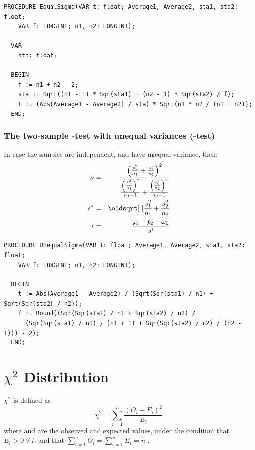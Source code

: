 \begin{refsection}
\begin{lstlisting}[caption=t for independent samples of equal variance]
  PROCEDURE EqualSigma(VAR t: float; Average1, Average2, sta1, sta2: float;
    VAR f: LONGINT; n1, n2: LONGINT);

  VAR
    sta: float;

  BEGIN
    f := n1 + n2 - 2;
    sta := Sqrt((n1 - 1) * Sqr(sta1) + (n2 - 1) * Sqr(sta2) / f);
    t := (Abs(Average1 - Average2) / sta) * Sqrt(n1 * n2 / (n1 + n2));
  END;
\end{lstlisting}

\subsubsection{The two-sample -test with unequal variances (-test)}

In case the samples are independent, and have unequal variance, then:
\begin{eqnarray}
  \nonumber
  \nu &=& \frac{\left( \frac{s_1^2}{n_1} + \frac{s_2^2}{n_2} \right)^2}{\frac{\left( \frac{s_1^2}{n_1} \right)^2}{n_1 - 1} + \frac{\left( \frac{s_2^2}{n_2} \right)^2}{n_2 - 1}}\\
  \nonumber
  s^* &=& \sqrt{\frac{s_1^2}{n_1} + \frac{s_2^2}{n_2}} \\
  t &=& \frac{\bar{\AbsVec{x}}_1 - \bar{\AbsVec{x}}_2 - \omega_0}{s^*}
\end{eqnarray}

\begin{lstlisting}[caption=t for independent samples of unequal variance]
  PROCEDURE UnequalSigma(VAR t: float; Average1, Average2, sta1, sta2: float;
    VAR f: LONGINT; n1, n2: LONGINT);

  BEGIN
    t := Abs(Average1 - Average2) / (Sqrt(Sqr(sta1) / n1) + Sqrt(Sqr(sta2) / n2));
    f := Round((Sqr(Sqr(sta1) / n1 + Sqr(sta2) / n2) /
      (Sqr(Sqr(sta1) / n1) / (n1 + 1) + Sqr(Sqr(sta2) / n2) / (n2 - 1))) - 2);
  END;
\end{lstlisting}


\section{ \( \chi^2 \) Distribution}\label{text:chi2}

\( \chi^2 \) is defined as
\begin{equation}
   \chi^2 = \sum_{i=1}^{n}{\frac{(O_i - E_i)^2}{E_i}}
\end{equation}
where  and  are the observed and expected values, under the condition that \( E_i > 0\ \forall\ i \), and that \( \sum_{i=1}^{n}{O_i} = \sum_{i=1}^{n}{E_i} = n \) \parencite{Hel-76}.


\end{refsection}
